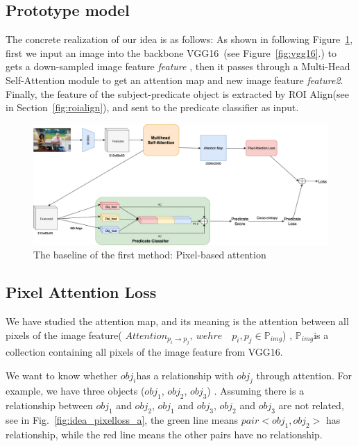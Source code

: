 \subsection{ Prototype model}
The concrete realization of our idea is as follows: As shown in following Figure~\ref{fig:method1baseline}, first we input an image into the  backbone VGG16~\cite{simonyan2015deep}(see Figure~\ref{fig:vgg16}.) to gets a down-sampled image feature \textit{feature} ,  then it passes through a Multi-Head Self-Attention module to get an attention map and new image feature \textit{feature2}. Finally, the feature of the subject-predicate object is extracted by ROI Align(see in Section~\ref{fig:roialign}), and sent to the predicate classifier as input.


\begin{figure}[H]
	\centering
	\includegraphics[width=1\linewidth]{figures/method1_baseline}
	\caption[The baseline of the first method: Pixel-based attention]{The baseline of the  first method: Pixel-based attention}
	\label{fig:method1baseline}
\end{figure}

\subsection{Pixel  Attention Loss}

We have studied the attention map, and its meaning is the attention between all pixels of the image feature( $ Attention_{p_i\to p_j}, \  wehre \quad p_i,p_j\in \mathbb{P}_{img} $) , $ \mathbb{P}_{img}  $is a collection containing all pixels of the image feature from VGG16.

We want to know whether $ obj_i  $has a relationship with $ obj_j$ through attention. For example, we have three objects ($ obj_1 $, $ obj_2 $, $ obj_3 $) . Assuming there is a relationship between $ obj_1 $ and $ obj_2 $, $ obj_1 $ and $ obj_3 $, $ obj_2 $ and $ obj_3 $ are not related, see in Fig.~\ref{fig:idea_pixelloss_a}, the green line means $ pair <obj_1,obj_2> $ has relationship, while the red line means the other pairs have no relationship. 


